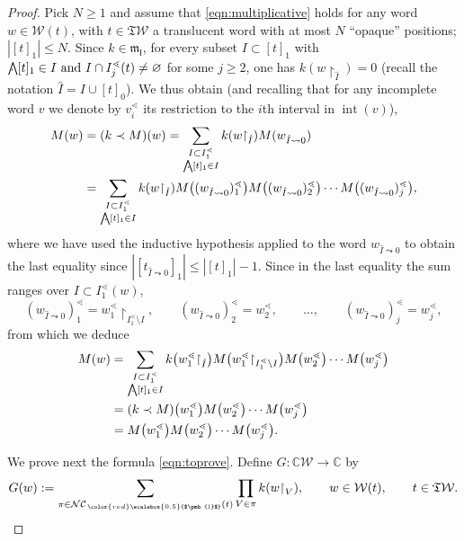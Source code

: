 \documentclass[pdftex]{sigma}
\newcommand\INT[1]{\operatorname{int}(#1)}
\renewcommand{\restriction}[2]{{#1\mathbin{\upharpoonright}_{#2}}}
\newcommand{\translucidation}[2]{{{#1}_{#2\leadsto0}}}
\newcommand{\stdl}{\lessdot}
\newcommand{\bigwedgedot}{{\mathop{\bigwedge\hspace{-7.8pt}\raisebox{-1pt}[0pt][0pt]{$\cdot$}\hspace{3pt}}\nolimits}}
\newcommand{\bigwedgedots}{{\mathop{\bigwedge\hspace{-6.5pt}\raisebox{-1.5pt}[0pt][0pt]{$\cdot$}\hspace{2pt}}\nolimits}}
\newcommand{\SWc}{{\mathfrak{T}\mathcal{W}}}
\newcommand\IWc{\mathcal{W}}
\newcommand{\BNCc}{\mathcal{N}\mathcal{C}}
\def\shBNCc{\BNCc_{\,{\color{red}\scalebox{0.5}{$\pmb{|}$}}}}
\def\CC{\mathbb{C}}
\newcommand\shalI{{\mathfrak m}_{\mathsf I}}
\numberwithin{equation}{section}
\begin{document}
\begin{proof}
	Pick $N\geq 1$ and assume that \eqref{eqn:multiplicative} holds for any word $w \in \IWc(t)$, with $t\in \SWc$ a translucent word with at most $N$ ``opaque'' positions; $|[t]_1|\leq N$. Since $k \in \shalI$, for every subset $I \subset [t]_1$ with
 $\bigwedgedot [t]_1 \in I {\rm~and~} I \cap I^{\stdl}_j(t) \neq \varnothing$ for some $j\geq 2$,
 one has $k(\restriction{w}{\hat{I}})=0$ (recall the notation $\hat I = I \cup [t]_0$).
 We thus obtain (and recalling that for any incomplete word $v$ we denote by $v_{i}^\stdl$ its restriction to the $i$th interval in $\INT{v}$),
	\begin{align*}
 M(w) & = (k \prec M)(w) = \sum_{\substack{I \subset I^{\stdl}_1 \\ \bigwedgedots [t]_1 \in I}} k(\restriction{w}{\hat{I}})M(\translucidation{w}{\hat{I}}) \\
 & = \sum_{\substack{I \subset I^{\stdl}_1 \\ \bigwedgedots [t]_1 \in I}} k(\restriction{w}{\hat{I}})M\big((\translucidation{w}{\hat{I}})^{\stdl}_1\big)M\big((\translucidation{w}{\hat{I}})^{\stdl}_2\big) \cdots M\big((\translucidation{w}{\hat{I}})^{\stdl}_{j}\big),
	\end{align*}
	where we have used the inductive hypothesis applied to the word $\translucidation{w}{\hat{I}}$ to obtain the last equality since $|[\translucidation{t}{\hat{I}}]_1|\leq |[t]_1|-1$. Since in the last equality the sum ranges over $I \subset I_1^{\stdl}(w)$,
	\begin{equation*}
		(\translucidation{w}{\hat{I}})^{\stdl}_1 = \restriction{w_1^{\stdl}}{I_1^{\stdl} \setminus I},\qquad (\translucidation{w}{\hat{I}})^{\stdl}_2 = w^{\stdl}_2,\qquad \dots, \qquad (\translucidation{w}{\hat{I}})^{\stdl}_{j} = w^{\stdl}_{j},
	\end{equation*}
	from which we deduce
	\begin{align*}
 M(w)
 &= \sum_{\substack{I \subset I^{\stdl}_1 \\ \bigwedgedots [t]_1 \in I}} k\big(\restriction{w_1^{\stdl}}{\hat{I}}\big)M\big(\restriction{w_1^{\stdl}}{I_1^{\stdl} \setminus I}\big)M\big(w^{\stdl}_2\big) \cdots M\big(w^{\stdl}_{j}\big)\\
					 &= (k\prec M)\big(w^{\stdl}_1\big)M\big(w^{\stdl}_2\big)\cdots M\big(w^{\stdl}_{j}\big) \\
					&=M\big(w^{\stdl}_1\big)M\big(w^{\stdl}_2\big)\cdots M\big(w^{\stdl}_{j}\big).
	\end{align*}

We prove next the formula \eqref{eqn:toprove}. Define $ G\colon \CC \IWc\to \CC$ by
	\begin{equation*}
		G(w) := \sum_{\pi\in{\shBNCc}(t)}\prod_{V\in \pi} k(\restriction{w}{V}),\qquad w\in \IWc(t),\qquad t \in \SWc.
	\end{equation*}


\end{proof}
\end{document}
